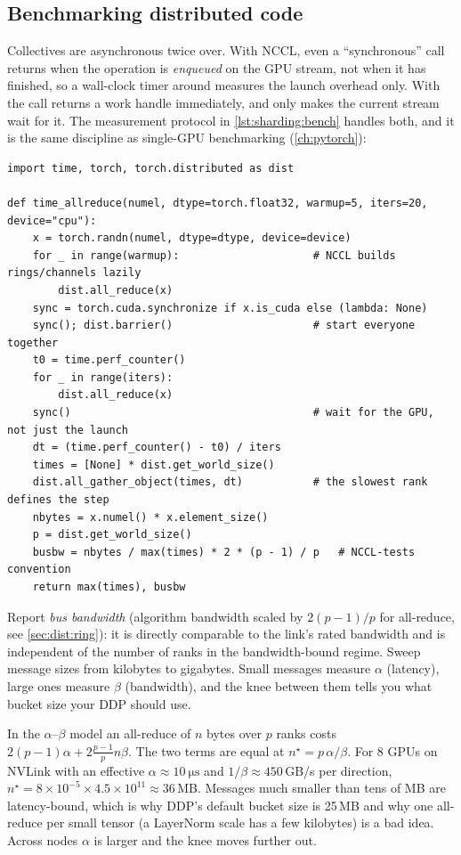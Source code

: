 \subsection{Benchmarking distributed code}

Collectives are asynchronous twice over. With NCCL, even a ``synchronous'' call returns when the
operation is \emph{enqueued} on the GPU stream, not when it has finished, so a wall-clock timer
around  measures the launch overhead only. With  the
call returns a work handle immediately, and  only makes the current stream
wait for it. The measurement protocol in \cref{lst:sharding:bench} handles both, and it is the same
discipline as single-GPU benchmarking (\cref{ch:pytorch}):

\begin{lstlisting}[caption={Timing a collective honestly and aggregating across ranks.},label={lst:sharding:bench}]
import time, torch, torch.distributed as dist

def time_allreduce(numel, dtype=torch.float32, warmup=5, iters=20, device="cpu"):
    x = torch.randn(numel, dtype=dtype, device=device)
    for _ in range(warmup):                     # NCCL builds rings/channels lazily
        dist.all_reduce(x)
    sync = torch.cuda.synchronize if x.is_cuda else (lambda: None)
    sync(); dist.barrier()                      # start everyone together
    t0 = time.perf_counter()
    for _ in range(iters):
        dist.all_reduce(x)
    sync()                                      # wait for the GPU, not just the launch
    dt = (time.perf_counter() - t0) / iters
    times = [None] * dist.get_world_size()
    dist.all_gather_object(times, dt)           # the slowest rank defines the step
    nbytes = x.numel() * x.element_size()
    p = dist.get_world_size()
    busbw = nbytes / max(times) * 2 * (p - 1) / p   # NCCL-tests convention
    return max(times), busbw
\end{lstlisting}

Report \emph{bus bandwidth} (algorithm bandwidth scaled by $2(p-1)/p$ for all-reduce, see
\cref{sec:dist:ring}): it is directly comparable to the link's rated bandwidth and is independent
of the number of ranks in the bandwidth-bound regime. Sweep message sizes from kilobytes to
gigabytes. Small messages measure $\alpha$ (latency), large ones measure $\beta$ (bandwidth), and
the knee between them tells you what bucket size your DDP should use.

\begin{napkinmath}
In the $\alpha$--$\beta$ model an all-reduce of $n$ bytes over $p$ ranks costs
$2(p-1)\alpha + 2\frac{p-1}{p}n\beta$. The two terms are equal at
$n^\star = p\,\alpha/\beta$. For 8 GPUs on NVLink with an effective $\alpha\approx\SI{10}{\micro\second}$
and $1/\beta \approx 450$\,GB/s per direction, $n^\star = 8\times10^{-5}\times 4.5\times10^{11}
\approx 36$\,MB. Messages much smaller than tens of MB are latency-bound, which is why DDP's
default bucket size is 25\,MB and why one all-reduce per small tensor (a LayerNorm scale has
a few kilobytes) is a bad idea. Across nodes $\alpha$ is larger and the knee moves further out.
\end{napkinmath}

